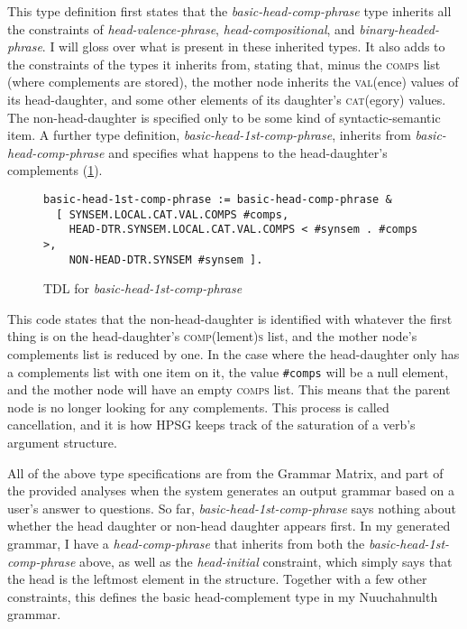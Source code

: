 This type definition first states that the \textit{basic-head-comp-phrase} type inherits all the constraints of \textit{head-valence-phrase}, \textit{head-compositional}, and \textit{binary-headed-phrase}. I will gloss over what is present in these inherited types. It also adds to the constraints of the types it inherits from, stating that, minus the \textsc{comps} list (where complements are stored), the mother node inherits the \textsc{val}(ence) values of its head-daughter, and some other elements of its daughter's \textsc{cat}(egory) values. The non-head-daughter is specified only to be some kind of syntactic-semantic item. A further type definition, \textit{basic-head-1st-comp-phrase}, inherits from \textit{basic-head-comp-phrase} and specifies what happens to the head-daughter's complements (\cref{figure:basic-head-1st-comp-phrase}).

\begin{figure}[H]
\caption{TDL for \textit{basic-head-1st-comp-phrase}}
\label{figure:basic-head-1st-comp-phrase}
\begin{verbatim}
basic-head-1st-comp-phrase := basic-head-comp-phrase &
  [ SYNSEM.LOCAL.CAT.VAL.COMPS #comps,
    HEAD-DTR.SYNSEM.LOCAL.CAT.VAL.COMPS < #synsem . #comps >,
    NON-HEAD-DTR.SYNSEM #synsem ].
\end{verbatim}
\end{figure}

\vspace{-5pt}

This code states that the non-head-daughter is identified with whatever the first thing is on the head-daughter's \textsc{comp}(lement)\textsc{s} list, and the mother node's complements list is reduced by one. In the case where the head-daughter only has a complements list with one item on it, the value \texttt{\#comps} will be a null element, and the mother node will have an empty \textsc{comps} list. This means that the parent node is no longer looking for any complements. This process is called cancellation, and it is how HPSG keeps track of the saturation of a verb's argument structure.

All of the above type specifications are from the Grammar Matrix, and part of the provided analyses when the system generates an output grammar based on a user's answer to questions. So far, \textit{\justify basic-head-1st-comp-phrase} says nothing about whether the head daughter or non-head daughter appears first. In my generated grammar, I have a \textit{head-comp-phrase} that inherits from both the \textit{\justify basic-head-1st-comp-phrase} above, as well as the \textit{head-initial} constraint, which simply says that the head is the leftmost element in the structure. Together with a few other constraints, this defines the basic head-complement type in my Nuuchahnulth grammar.

